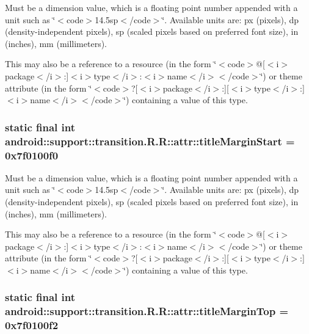 Must be a dimension value, which is a floating point number appended with a unit such as \char`\"{}$<$code$>$14.5sp$<$/code$>$\char`\"{}. Available units are: px (pixels), dp (density-independent pixels), sp (scaled pixels based on preferred font size), in (inches), mm (millimeters). 

This may also be a reference to a resource (in the form \char`\"{}$<$code$>$@\mbox{[}$<$i$>$package$<$/i$>$:\mbox{]}$<$i$>$type$<$/i$>$:$<$i$>$name$<$/i$>$$<$/code$>$\char`\"{}) or theme attribute (in the form \char`\"{}$<$code$>$?\mbox{[}$<$i$>$package$<$/i$>$:\mbox{]}\mbox{[}$<$i$>$type$<$/i$>$:\mbox{]}$<$i$>$name$<$/i$>$$<$/code$>$\char`\"{}) containing a value of this type. \hypertarget{classandroid_1_1support_1_1transition_1_1_r_1_1attr_7457879ea25dff78d244e08797d9caef}{
\subsubsection[{titleMarginStart}]{\setlength{\rightskip}{0pt plus 5cm}static final int android::support::transition.R.R::attr::titleMarginStart = 0x7f0100f0}}
\label{classandroid_1_1support_1_1transition_1_1_r_1_1attr_7457879ea25dff78d244e08797d9caef}


Must be a dimension value, which is a floating point number appended with a unit such as \char`\"{}$<$code$>$14.5sp$<$/code$>$\char`\"{}. Available units are: px (pixels), dp (density-independent pixels), sp (scaled pixels based on preferred font size), in (inches), mm (millimeters). 

This may also be a reference to a resource (in the form \char`\"{}$<$code$>$@\mbox{[}$<$i$>$package$<$/i$>$:\mbox{]}$<$i$>$type$<$/i$>$:$<$i$>$name$<$/i$>$$<$/code$>$\char`\"{}) or theme attribute (in the form \char`\"{}$<$code$>$?\mbox{[}$<$i$>$package$<$/i$>$:\mbox{]}\mbox{[}$<$i$>$type$<$/i$>$:\mbox{]}$<$i$>$name$<$/i$>$$<$/code$>$\char`\"{}) containing a value of this type. \hypertarget{classandroid_1_1support_1_1transition_1_1_r_1_1attr_82d2ad4bae23780166117bc604b4e88a}{
\subsubsection[{titleMarginTop}]{\setlength{\rightskip}{0pt plus 5cm}static final int android::support::transition.R.R::attr::titleMarginTop = 0x7f0100f2}}
\label{classandroid_1_1support_1_1transition_1_1_r_1_1attr_82d2ad4bae23780166117bc604b4e88a}


